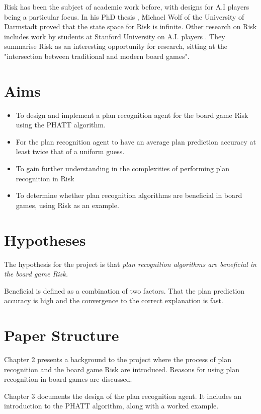 \documentclass[parskip]{cs4rep}
\begin{document}
Risk has been the subject of academic work before, with designs for A.I players being a particular focus. In his PhD thesis \cite{michaelwolf}, Michael Wolf of the University of Darmstadt proved that the state space for Risk is infinite. Other research on Risk includes work by students at Stanford University on A.I. players \cite{jlozanodbratz}. They summarise Risk as an interesting opportunity for research, sitting at the "intersection between traditional and modern board games".

\section{Aims}

\begin{itemize}
\item
To design and implement a plan recognition agent for the board game Risk using the PHATT algorithm.
\item
For the plan recognition agent to have an average plan prediction accuracy at least twice that of a uniform guess.
\item
To gain further understanding in the complexities of performing plan recognition in Risk
\item
To determine whether plan recognition algorithms are beneficial in board games, using Risk as an example.
\end{itemize}

\section{Hypotheses}

The hypothesis for the project is that \textit{plan recognition algorithms are beneficial in the board game Risk.}

Beneficial is defined as a combination of two factors. That the plan prediction accuracy is high and the convergence to the correct explanation is fast.

\section{Paper Structure}

Chapter 2 presents a background to the project where the process of plan recognition and the board game Risk are introduced. Reasons for using plan recognition in board games are discussed.

Chapter 3 documents the design of the plan recognition agent. It includes an introduction to the PHATT algorithm, along with a worked example. 
\end{document}
